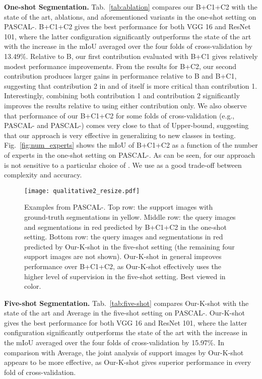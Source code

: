 \documentclass[10pt,twocolumn,letterpaper]{article}
\begin{document}
{\bf One-shot Segmentation.}
Tab.~\ref{tab:ablation} compares our B+C1+C2 with the state of the art, ablations, and aforementioned variants in the one-shot setting on PASCAL-. B+C1+C2 gives the best performance for both VGG 16 and ResNet 101, where the latter configuration significantly outperforms the state of the art with the increase in the mIoU averaged over the four folds of cross-validation by 13.49\%. Relative to B, our first contribution evaluated with B+C1 gives relatively modest performance improvements. From the results for B+C2, our second contribution produces larger gains in performance relative to B and B+C1, suggesting that contribution 2 in and of itself is more critical than contribution 1. Interestingly, combining both contribution 1 and contribution 2 significantly improves the results relative to using either contribution only. We also observe that performance of our B+C1+C2 for some folds of cross-validation (e.g., PASCAL- and PASCAL-)  comes very close to that of Upper-bound, suggesting that our approach is very effective in generalizing to new classes in testing.  Fig.~\ref{fig:num_experts} shows the mIoU of B+C1+C2 as a function of the number of experts  in the one-shot setting on PASCAL-. As can be seen, for  our approach is not sensitive to a particular choice of . We use  as a good trade-off between complexity and accuracy.


\begin{figure}[h!]
    \centering
    \texttt{[image: qualitative2\_resize.pdf]}
    \caption{Examples from PASCAL-. Top row: the support images with ground-truth segmentations in yellow. Middle row: the query images and segmentations in red predicted  by B+C1+C2 in the one-shot setting. Bottom row: the query images and segmentations in red predicted  by Our-K-shot in the five-shot setting (the remaining four support images are not shown). Our-K-shot in general improves performance over B+C1+C2, as  Our-K-shot effectively uses the higher level of supervision in  the five-shot setting. Best viewed in color.}
    \label{fig:qualitative2}
\end{figure}  

{\bf Five-shot Segmentation.}
Tab.~\ref{tab:five-shot} compares Our-K-shot with the state of the art and Average in the five-shot setting on PASCAL-. Our-K-shot gives the best performance for both VGG 16 and ResNet 101, where the latter configuration significantly outperforms the state of the art with the increase in the mIoU averaged over the four folds of cross-validation by 15.97\%. In comparison with Average, the joint analysis of  support images by Our-K-shot appears to be more effective, as Our-K-shot gives superior performance in every fold of cross-validation.
\end{document}
